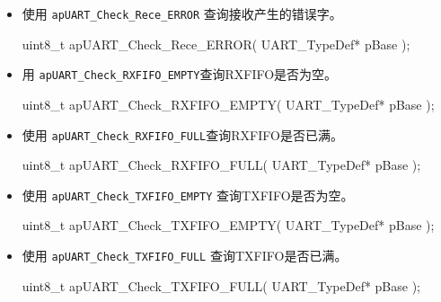 \documentclass[
  12pt,
]{book}
\newenvironment{Shaded}{\begin{snugshade}}{\end{snugshade}}
\newcommand{\DataTypeTok}[1]{\textcolor[rgb]{0.13,0.29,0.53}{#1}}
\newcommand{\NormalTok}[1]{#1}
\begin{document}
\begin{itemize}
\item
  使用 \texttt{apUART\_Check\_Rece\_ERROR} 查询接收产生的错误字。

\begin{Shaded}
\begin{Highlighting}[]
  \DataTypeTok{uint8_t}\NormalTok{ apUART_Check_Rece_ERROR(}
\NormalTok{    UART_TypeDef* pBase}
\NormalTok{    );}
\end{Highlighting}
\end{Shaded}
\item
  用 \texttt{apUART\_Check\_RXFIFO\_EMPTY}查询RXFIFO是否为空。

\begin{Shaded}
\begin{Highlighting}[]
  \DataTypeTok{uint8_t}\NormalTok{ apUART_Check_RXFIFO_EMPTY(}
\NormalTok{    UART_TypeDef* pBase}
\NormalTok{    );}
\end{Highlighting}
\end{Shaded}
\item
  使用 \texttt{apUART\_Check\_RXFIFO\_FULL}查询RXFIFO是否已满。

\begin{Shaded}
\begin{Highlighting}[]
  \DataTypeTok{uint8_t}\NormalTok{ apUART_Check_RXFIFO_FULL(}
\NormalTok{    UART_TypeDef* pBase}
\NormalTok{    );}
\end{Highlighting}
\end{Shaded}
\item
  使用 \texttt{apUART\_Check\_TXFIFO\_EMPTY} 查询TXFIFO是否为空。

\begin{Shaded}
\begin{Highlighting}[]
  \DataTypeTok{uint8_t}\NormalTok{ apUART_Check_TXFIFO_EMPTY(}
\NormalTok{    UART_TypeDef* pBase}
\NormalTok{    );}
\end{Highlighting}
\end{Shaded}
\item
  使用 \texttt{apUART\_Check\_TXFIFO\_FULL} 查询TXFIFO是否已满。

\begin{Shaded}
\begin{Highlighting}[]
  \DataTypeTok{uint8_t}\NormalTok{ apUART_Check_TXFIFO_FULL(}
\NormalTok{    UART_TypeDef* pBase}
\NormalTok{    ); }
\end{Highlighting}
\end{Shaded}
\end{itemize}
\end{document}
